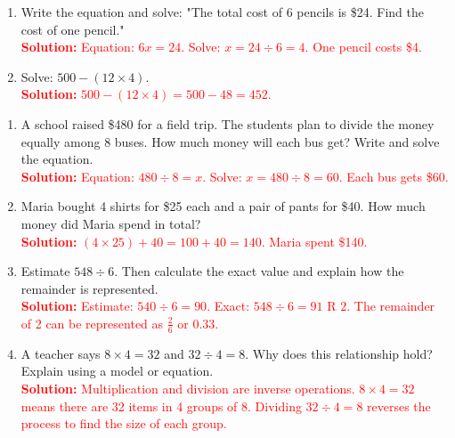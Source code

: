 \documentclass[12pt]{article}
\begin{document}
\begin{tcolorbox}[colframe=black!60, colback=white, 
coltitle=black, colbacktitle=black!15, fonttitle=\bfseries\Large, 
title=Exercises, halign title=center, left=10pt, right=10pt, top=10pt, bottom=60pt]
\begin{enumerate}[itemsep=3em]
    \item Write the equation and solve: "The total cost of 6 pencils is \$24. Find the cost of one pencil."\\
    \textcolor{red}{\textbf{Solution:} Equation: \( 6x = 24 \). Solve: \( x = 24 \div 6 = 4 \). One pencil costs \$4.}

    \item Solve: \( 500 - (12 \times 4) \).\\
    \textcolor{red}{\textbf{Solution:} \( 500 - (12 \times 4) = 500 - 48 = 452 \).}
\end{enumerate}
\end{tcolorbox}

\vspace{1em}

\begin{tcolorbox}[colframe=black!60, colback=white, 
coltitle=black, colbacktitle=black!15, fonttitle=\bfseries\Large, 
title=Problems, halign title=center, left=10pt, right=10pt, top=10pt, bottom=80pt]
\begin{enumerate}[start=9, itemsep=2em]
    \item A school raised \$480 for a field trip. The students plan to divide the money equally among 8 buses. How much money will each bus get? Write and solve the equation.\\
    \textcolor{red}{\textbf{Solution:} Equation: \( 480 \div 8 = x \). Solve: \( x = 480 \div 8 = 60 \). Each bus gets \$60.}

    \item Maria bought 4 shirts for \$25 each and a pair of pants for \$40. How much money did Maria spend in total?\\
    \textcolor{red}{\textbf{Solution:} \( (4 \times 25) + 40 = 100 + 40 = 140 \). Maria spent \$140.}

    \item Estimate \( 548 \div 6 \). Then calculate the exact value and explain how the remainder is represented.\\
    \textcolor{red}{\textbf{Solution:} Estimate: \( 540 \div 6 = 90 \). Exact: \( 548 \div 6 = 91 \text{ R }2 \). The remainder of 2 can be represented as \( \frac{2}{6} \) or \( 0.33 \).}

    \item A teacher says \( 8 \times 4 = 32 \) and \( 32 \div 4 = 8 \). Why does this relationship hold? Explain using a model or equation.\\
    \textcolor{red}{\textbf{Solution:} Multiplication and division are inverse operations. \( 8 \times 4 = 32 \) means there are 32 items in 4 groups of 8. Dividing \( 32 \div 4 = 8 \) reverses the process to find the size of each group.}


\end{enumerate}
\end{tcolorbox}
\end{document}
